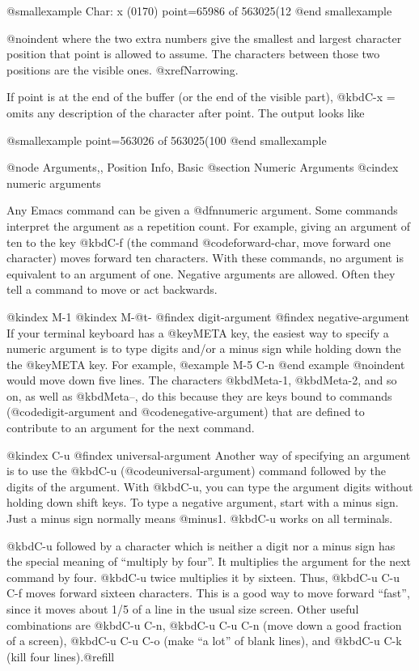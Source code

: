 {{{{{{@smallexample
Char: x (0170)  point=65986 of 563025(12%
@end smallexample

@noindent
where the two extra numbers give the smallest and largest character position
that point is allowed to assume.  The characters between those two positions
are the visible ones.  @xref{Narrowing}.

  If point is at the end of the buffer (or the end of the visible part),
@kbd{C-x =} omits any description of the character after point.
The output looks like

@smallexample
point=563026 of 563025(100%
@end smallexample

@node Arguments,, Position Info, Basic
@section Numeric Arguments
@cindex numeric arguments

  Any Emacs command can be given a @dfn{numeric argument}.  Some commands
interpret the argument as a repetition count.  For example, giving an
argument of ten to the key @kbd{C-f} (the command @code{forward-char}, move
forward one character) moves forward ten characters.  With these commands,
no argument is equivalent to an argument of one.  Negative arguments are
allowed.  Often they tell a command to move or act backwards.

@kindex M-1
@kindex M-@t{-}
@findex digit-argument
@findex negative-argument
  If your terminal keyboard has a @key{META} key, the easiest way to
specify a numeric argument is to type digits and/or a minus sign while
holding down the the @key{META} key.  For example,
@example
M-5 C-n
@end example
@noindent
would move down five lines.  The characters @kbd{Meta-1}, @kbd{Meta-2}, and
so on, as well as @kbd{Meta--}, do this because they are keys bound to
commands (@code{digit-argument} and @code{negative-argument}) that are
defined to contribute to an argument for the next command.

@kindex C-u
@findex universal-argument
  Another way of specifying an argument is to use the @kbd{C-u}
(@code{universal-argument}) command followed by the digits of the argument.
With @kbd{C-u}, you can type the argument digits without holding
down shift keys.  To type a negative argument, start with a minus sign.
Just a minus sign normally means @minus{}1.  @kbd{C-u} works on all terminals.

  @kbd{C-u} followed by a character which is neither a digit nor a minus
sign has the special meaning of ``multiply by four''.  It multiplies the
argument for the next command by four.  @kbd{C-u} twice multiplies it by
sixteen.  Thus, @kbd{C-u C-u C-f} moves forward sixteen characters.  This
is a good way to move forward ``fast'', since it moves about 1/5 of a line
in the usual size screen.  Other useful combinations are @kbd{C-u C-n},
@kbd{C-u C-u C-n} (move down a good fraction of a screen), @kbd{C-u C-u
C-o} (make ``a lot'' of blank lines), and @kbd{C-u C-k} (kill four
lines).@refill

}}}}}}
